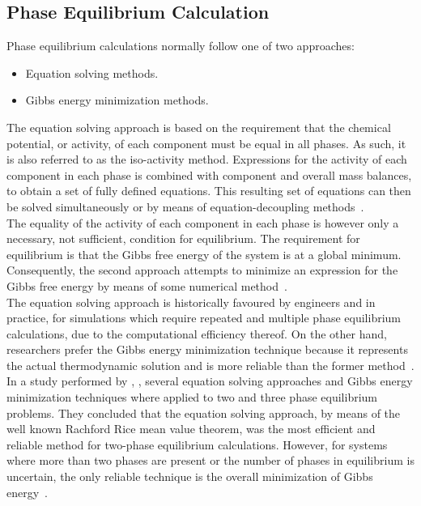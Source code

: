 \subsection{Phase Equilibrium Calculation}

Phase equilibrium calculations normally follow one of two approaches:~\cite{PhaseEquilCalcsESandGEM}\

\begin{itemize}
\item Equation solving methods.\
\item Gibbs energy minimization methods.
\end{itemize}

The equation solving approach is based on the requirement that the chemical potential, or activity, of each component must be equal in all phases. As such, it is also referred to as the iso-activity method. Expressions for the activity of each component in each phase is combined with component and overall mass balances, to obtain a set of fully defined equations. This resulting set of equations can then be solved simultaneously or by means of equation-decoupling methods~\cite{PhaseEquilCalcsESandGEM, ThermodynamicModels, ComputerCalculationsVLEandLLE}.\\

The equality of the activity of each component in each phase is however only a necessary, not sufficient, condition for equilibrium. The requirement for equilibrium is that the Gibbs free energy of the system is at a global minimum. Consequently, the second approach attempts to minimize an expression for the Gibbs free energy by means of some numerical method~\cite{PhaseEquilCalcsESandGEM, ThermodynamicModels}.\\

The equation solving approach is historically favoured by engineers and in practice, for simulations which require repeated and multiple phase equilibrium calculations, due to the computational efficiency thereof. On the other hand, researchers prefer the Gibbs energy minimization technique because it represents the actual thermodynamic solution and is more reliable than the former method~\cite{PhaseEquilCalcsESandGEM}.\\

In a study performed by \citeauthor{PhaseEquilCalcsESandGEM}, \citeyear{PhaseEquilCalcsESandGEM}, several equation solving approaches and Gibbs energy minimization techniques where applied to two and three phase equilibrium problems. They concluded that the equation solving approach, by means of the well known Rachford Rice mean value theorem, was the most efficient and reliable method for two-phase equilibrium calculations. However, for systems where more than two phases are present or the number of phases in equilibrium is uncertain, the only reliable technique is the overall  minimization of Gibbs energy~\cite{PhaseEquilCalcsESandGEM}.\\


